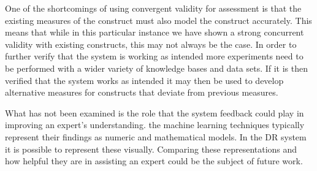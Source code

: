 One of the shortcomings of using convergent validity for assessment is that the existing measures of the construct must also model the construct accurately. This means that while in this particular instance we have shown a strong concurrent validity with existing constructs, this may not always be the case. In order to further verify that the system is working as intended more experiments need to be performed with a wider variety of knowledge bases and data sets. If it is then verified that the system works as intended it may then be used to develop alternative measures for constructs that deviate from previous measures. 

What has not been examined is the role that the system feedback could play in improving an expert's understanding. the machine learning techniques typically represent their findings as numeric and mathematical models. In the DR system it is possible to represent these visually. Comparing these representations and how helpful they are in assisting an expert could be the subject of future work.